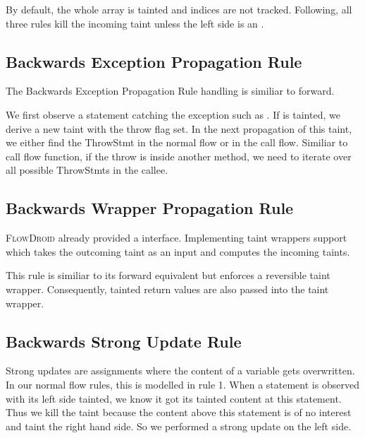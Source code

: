 \documentclass[../draft.tex]{subfiles}
\begin{document}
    By default, the whole array is tainted and indices are not tracked. Following, all three rules kill the incoming taint unless the left side is an . 

    \subsection{Backwards Exception Propagation Rule}
    The Backwards Exception Propagation Rule handling is similiar to forward. 

    We first observe a statement catching the exception such as . If  is tainted, we derive a new taint with the throw flag set. In the next propagation of this taint, we either find the ThrowStmt in the normal flow or in the call flow. Similiar to call flow function, if the throw is inside another method, we need to iterate over all possible ThrowStmts in the callee. 

    \subsection{Backwards Wrapper Propagation Rule}
    \textsc{FlowDroid} already provided a  interface. Implementing taint wrappers support  which takes the outcoming taint as an input and computes the incoming taints.

    This rule is similiar to its forward equivalent but enforces a reversible taint wrapper. Consequently, tainted return values are also passed into the taint wrapper.



    \subsection{Backwards Strong Update Rule}
    Strong updates are assignments where the content of a variable gets overwritten. In our normal flow rules, this is modelled in rule 1. When a statement is observed with its left side tainted, we know it got its tainted content at this statement. Thus we kill the taint because the content above this statement is of no interest and taint the right hand side. So we performed a strong update on the left side. 
\end{document}
